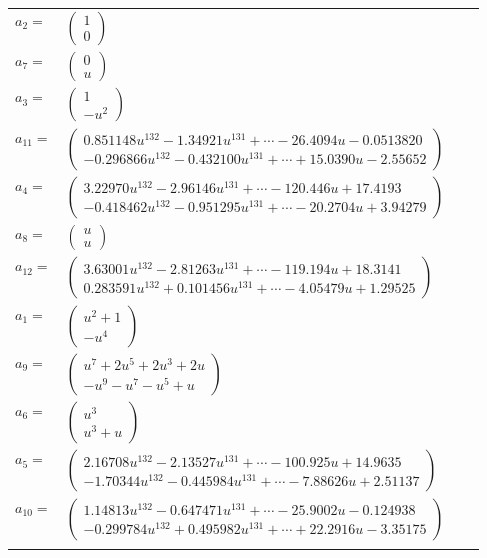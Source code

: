 \documentclass[1p]{elsarticle_modified}
\theoremstyle{definition}
\begin{document}
\begin{tabular}{m{7pt} m{180pt} m{7pt} m{180pt} }
\flushright $a_{2}=$&$\begin{pmatrix}1\\0\end{pmatrix}$ \\
\flushright $a_{7}=$&$\begin{pmatrix}0\\u\end{pmatrix}$ \\
\flushright $a_{3}=$&$\begin{pmatrix}1\\- u^2\end{pmatrix}$ \\
\flushright $a_{11}=$&$\begin{pmatrix}0.851148 u^{132}-1.34921 u^{131}+\cdots-26.4094 u-0.0513820\\-0.296866 u^{132}-0.432100 u^{131}+\cdots+15.0390 u-2.55652\end{pmatrix}$ \\
\flushright $a_{4}=$&$\begin{pmatrix}3.22970 u^{132}-2.96146 u^{131}+\cdots-120.446 u+17.4193\\-0.418462 u^{132}-0.951295 u^{131}+\cdots-20.2704 u+3.94279\end{pmatrix}$ \\
\flushright $a_{8}=$&$\begin{pmatrix}u\\u\end{pmatrix}$ \\
\flushright $a_{12}=$&$\begin{pmatrix}3.63001 u^{132}-2.81263 u^{131}+\cdots-119.194 u+18.3141\\0.283591 u^{132}+0.101456 u^{131}+\cdots-4.05479 u+1.29525\end{pmatrix}$ \\
\flushright $a_{1}=$&$\begin{pmatrix}u^2+1\\- u^4\end{pmatrix}$ \\
\flushright $a_{9}=$&$\begin{pmatrix}u^7+2 u^5+2 u^3+2 u\\- u^9- u^7- u^5+u\end{pmatrix}$ \\
\flushright $a_{6}=$&$\begin{pmatrix}u^3\\u^3+u\end{pmatrix}$ \\
\flushright $a_{5}=$&$\begin{pmatrix}2.16708 u^{132}-2.13527 u^{131}+\cdots-100.925 u+14.9635\\-1.70344 u^{132}-0.445984 u^{131}+\cdots-7.88626 u+2.51137\end{pmatrix}$ \\
\flushright $a_{10}=$&$\begin{pmatrix}1.14813 u^{132}-0.647471 u^{131}+\cdots-25.9002 u-0.124938\\-0.299784 u^{132}+0.495982 u^{131}+\cdots+22.2916 u-3.35175\end{pmatrix}$\\&\end{tabular}
\end{document}
